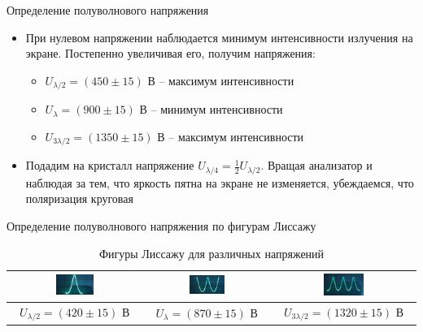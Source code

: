 \documentclass[11pt]{beamer} %
\begin{document}
    \begin{frame}{Определение полуволнового напряжения}
        \begin{itemize}
            \item При нулевом напряжении наблюдается минимум интенсивности излучения на экране. Постепенно увеличивая его, получим напряжения:
            \begin{itemize}
                \item $U_{\lambda/2} = (450 \pm 15) \text{ В}$ -- максимум интенсивности
                \item $U_\lambda = (900 \pm 15) \text{ В}$ -- минимум интенсивности
                \item $U_{3\lambda/2} = (1350 \pm 15) \text{ В}$ -- максимум интенсивности
            \end{itemize}
    
            \item Подадим на кристалл напряжение $U_{\lambda/4} = \frac{1}{2}U_{\lambda/2}$. Вращая анализатор и наблюдая за тем, что яркость пятна на экране не изменяется, убеждаемся, что поляризация круговая
        \end{itemize}
    \end{frame}

    \begin{frame}{Определение полуволнового напряжения по фигурам Лиссажу}
        \begin{table}
            \centering
                \begin{tabular}{|c|c|c|}
                    \hline
                    \includegraphics[width = 0.3\textwidth]{images/Lissagu1.jpg}  & \includegraphics[width = 0.3\textwidth]{images/Lissagu2.jpg}  &  \includegraphics[width = 0.3\textwidth]{images/Lissagu3.jpg} \\ \hline
                     $U_{\lambda/2} = (420 \pm 15) \text{ В}$ & $U_\lambda = (870 \pm 15) \text{ В}$  & $U_{3\lambda/2} = (1320 \pm 15) \text{ В}$ \\ \hline
                \end{tabular}
                \caption{Фигуры Лиссажу для различных напряжений}
                \label{tab:lissagu}
        \end{table}
    \end{frame}
\end{document}
